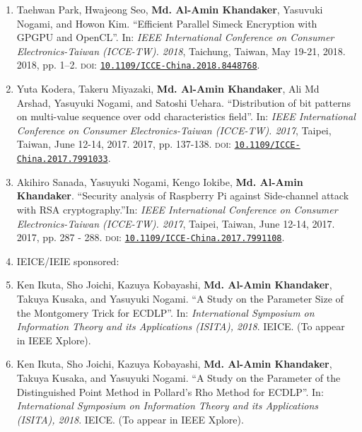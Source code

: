 \begin{itemize}
\begin{enumerate}
   	\item Taehwan Park, Hwajeong Seo, \textbf{Md. Al-Amin Khandaker}, Yasuvuki Nogami, and Howon Kim. ``Efficient Parallel Simeck Encryption with GPGPU and OpenCL''. In: \textit{IEEE International Conference on Consumer Electronics-Taiwan (ICCE-TW). 2018}, Taichung, Taiwan, May 19-21, 2018. 2018, pp. 1–2. \textsc{doi}: \href{https://doi.org/10.1109/ICCE-China.2018.8448768}{\texttt{10.1109/ICCE-China.2018.8448768}}.
   	
   	\item Yuta Kodera, Takeru Miyazaki, \textbf{Md. Al-Amin Khandaker}, Ali Md Arshad, Yasuyuki Nogami, and Satoshi Uehara. ``Distribution of bit patterns on multi-value sequence over odd characteristics field''.  In: \textit{IEEE International Conference on Consumer Electronics-Taiwan (ICCE-TW). 2017}, Taipei, Taiwan, June 12-14, 2017. 2017, pp. 137-138. \textsc{doi}: \href{https://doi.org/10.1109/ICCE-China.2017.7991033}{\texttt{10.1109/ICCE-\\China.2017.7991033}}.	
   
	\item Akihiro Sanada, Yasuyuki Nogami, Kengo Iokibe, \textbf{Md. Al-Amin Khandaker}. ``Security analysis of Raspberry Pi against Side-channel attack with RSA cryptography.''In: \textit{IEEE International Conference on Consumer Electronics-Taiwan (ICCE-TW). 2017}, Taipei, Taiwan, June 12-14, 2017. 2017, pp. 287 - 288. \textsc{doi}: \href{https://doi.org/10.1109/ICCE-China.2017.7991108}{\texttt{10.1109/ICCE-China.2017.7991108}}.	
	
		\vspace{5mm}
	\item[ ] \Large IEICE/IEIE sponsored:
	\normalsize
	\item Ken Ikuta, Sho Joichi, Kazuya Kobayashi, \textbf{Md. Al-Amin Khandaker}, Takuya Kusaka, and Yasuyuki Nogami. ``A Study on the Parameter Size of the Montgomery Trick for ECDLP''. In: \textit{International Symposium on Information Theory and its Applications (ISITA), 2018}. IEICE. (To appear in IEEE Xplore).
	
	\item Ken Ikuta, Sho Joichi, Kazuya Kobayashi, \textbf{Md. Al-Amin Khandaker}, Takuya Kusaka, and Yasuyuki Nogami. ``A Study on the Parameter of the Distinguished Point Method in Pollard's Rho Method for ECDLP''. In: \textit{International Symposium on Information Theory and its Applications (ISITA), 2018}. IEICE. (To appear in IEEE Xplore).	
	

\end{enumerate}
\end{itemize}
